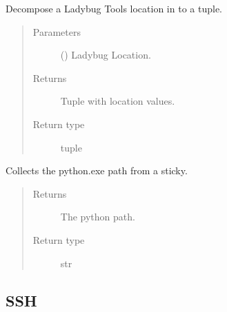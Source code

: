 \documentclass[letterpaper,10pt,english]{sphinxmanual}
\begin{document}

\begin{fulllineitems}
\label{\detokenize{lib:livestock.lib.misc.decompose_ladybug_location}}
Decompose a Ladybug Tools location in to a tuple.
\begin{quote}\begin{description}
\item[{Parameters}] \leavevmode
{} () \textendash{} Ladybug Location.

\item[{Returns}] \leavevmode
Tuple with location values.

\item[{Return type}] \leavevmode
tuple

\end{description}\end{quote}

\end{fulllineitems}


\begin{fulllineitems}
\label{\detokenize{lib:livestock.lib.misc.get_python_exe}}
Collects the python.exe path from a sticky.
\begin{quote}\begin{description}
\item[{Returns}] \leavevmode
The python path.

\item[{Return type}] \leavevmode
str

\end{description}\end{quote}

\end{fulllineitems}



\subsection{SSH}
\label{\detokenize{lib:ssh}}\label{\detokenize{lib:module-livestock.lib.ssh}}
\end{document}
